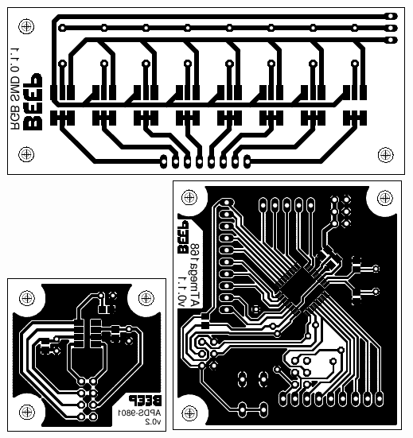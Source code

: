 \documentclass[a4paper]{scrartcl}
\begin{document}
\includegraphics{../8_RGB_SMD_LEDs}\hspace{5mm}
\includegraphics{../APDS-9801}\hspace{5mm}
\includegraphics{../ATMEGA168}\hspace{5mm}
\end{document}

